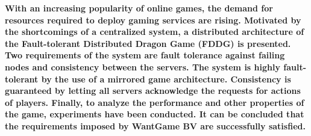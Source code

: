 \textbf{With an increasing popularity of online games, the demand for resources required to deploy gaming services are rising.
	Motivated by the shortcomings of a centralized system, a distributed architecture of the Fault-tolerant Distributed Dragon Game (FDDG) is presented. 
	Two requirements of the system are fault tolerance against failing nodes and consistency between the servers.
	The system is highly fault-tolerant by the use of a mirrored game architecture. 
	Consistency is guaranteed by letting all servers acknowledge the requests for actions of players. 
	Finally, to analyze the performance and other properties of the game, experiments have been conducted. 
	It can be concluded that the requirements imposed by WantGame BV are successfully satisfied.}